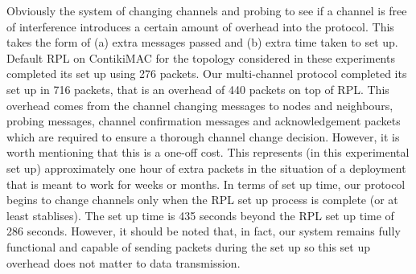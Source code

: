 


Obviously the system of changing channels and probing to see if a channel is free of interference introduces a certain amount of overhead into
the protocol.  This takes the form of (a) extra messages passed and (b) extra time taken to set up.  Default RPL on ContikiMAC for the topology considered in these experiments completed its set up using 276 packets.  Our multi-channel protocol completed its set up in 716 packets, that is an overhead of 440 packets on top of RPL. 
This overhead comes from the channel changing messages to nodes and neighbours, probing messages, channel confirmation messages and acknowledgement packets which are required to ensure a thorough channel change decision.
However, it is worth mentioning that this is a one-off cost.  This represents (in this experimental set up) approximately one hour of extra packets in the situation of a deployment that is meant to work for weeks or months.  In terms of set up time, our protocol begins to change channels only when the RPL set up process is complete (or at least stablises).  The set up time is 435 seconds beyond the 
RPL set up time of 286 seconds.  However, it should be noted that, in fact, our system remains fully functional and capable of sending packets during
the set up so this set up overhead does not matter to data transmission.




